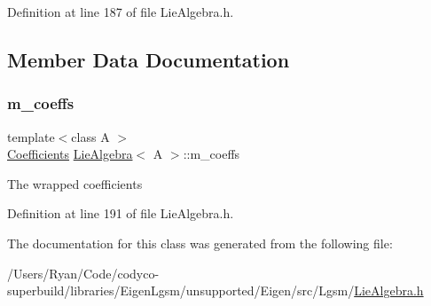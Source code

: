 Definition at line 187 of file Lie\+Algebra.\+h.



\subsection{Member Data Documentation}
\hypertarget{class_lie_algebra_a00c8e1711af4458171c63741aec83ffc}{}\label{class_lie_algebra_a00c8e1711af4458171c63741aec83ffc} 
\subsubsection{\texorpdfstring{m\+\_\+coeffs}{m\_coeffs}}
{\footnotesize\ttfamily template$<$class A $>$ \\
\hyperlink{class_lie_algebra_a366fde92cd31cf93be87fe82952c8ebb}{Coefficients} \hyperlink{class_lie_algebra}{Lie\+Algebra}$<$ A $>$\+::m\+\_\+coeffs\hspace{0.3cm}{\ttfamily [protected]}}

The wrapped coefficients 

Definition at line 191 of file Lie\+Algebra.\+h.



The documentation for this class was generated from the following file\+:\begin{DoxyCompactItemize}
\item 
/\+Users/\+Ryan/\+Code/codyco-\/superbuild/libraries/\+Eigen\+Lgsm/unsupported/\+Eigen/src/\+Lgsm/\hyperlink{_lie_algebra_8h}{Lie\+Algebra.\+h}\end{DoxyCompactItemize}
